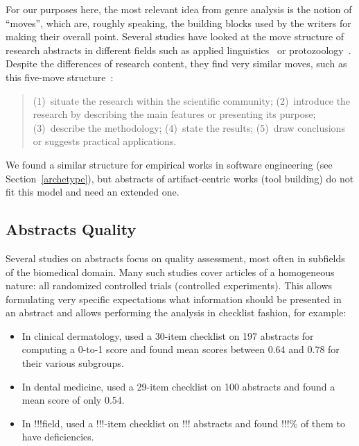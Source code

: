 \documentclass[10pt,journal,compsoc]{IEEEtran}
\begin{document}
For our purposes here, the most relevant idea from genre analysis is the notion
of ``moves'', which are, roughly speaking, the building blocks used by the writers
for making their overall point.
Several studies have looked at the move structure of research abstracts
in different fields such as
applied linguistics~\cite{DosSantos96} or
protozoology~\cite{CroOpp06}.
Despite the differences of research content, they find very similar moves,
such as this five-move structure~\cite{CroOpp06}:
\begin{quote}
	(1)~situate the research within the scientific community;
	(2)~introduce the research by describing the main features or presenting its purpose;
	(3)~describe the methodology;
	(4)~state the results;
	(5)~draw conclusions or suggests practical applications.
\end{quote}
We found a similar structure
for empirical works in software engineering (see Section~\ref{archetype}),
but abstracts of artifact-centric works (tool building) do not fit this model and need
an extended one.


\subsection{Abstracts Quality}

Several studies on abstracts focus on quality assessment,
most often in subfields of the biomedical domain.
Many such studies cover articles of a homogeneous nature:
all randomized controlled trials (controlled experiments).
This allows formulating very specific expectations what information should be
presented in an abstract and allows performing the analysis in checklist fashion,
for example:
\begin{itemize}
  \item In clinical dermatology, \cite{DupKhoLeb03} used a 30-item checklist on 197 abstracts
        for computing a 0-to-1 score and found mean scores between 0.64 and 0.78 for their various subgroups.
  \item In dental medicine, \cite{ShaHar06} used a 29-item checklist on 100 abstracts
        and found a mean score of only 0.54.
  \item In !!!field, \cite{} used a !!!-item checklist on !!! abstracts
        and found !!!\% of them to have deficiencies.
\end{itemize}
\end{document}

